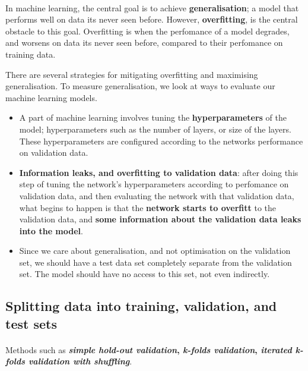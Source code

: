 \documentclass[12pt, a4paper]{article}
\begin{document}
\paragraph*{}
In machine learning, the central goal is to achieve \textbf{generalisation};
a model that performs well on data its never seen before. However, \textbf{overfitting},
is the central obstacle to this goal. Overfitting is when the perfomance of a model
degrades, and worsens on data its never seen before, compared to their perfomance
on training data.

There are several strategies for mitigating overfitting and maximising generalisation.
To measure generalisation, we look at ways to evaluate our machine learning models.

\begin{itemize}
   \item A part of machine learning involves tuning the \textbf{hyperparameters}
   of the model; hyperparameters such as the number of layers, or size of the layers.
   These hyperparameters are configured according to the networks performance on 
   validation data.
   \item \textbf{Information leaks, and overfitting to validation data}:
   after doing this step of tuning the network's hyperparameters according to perfomance
   on validation data, and then evaluating the network with that validation data,
   what begins to happen is that the \textbf{network starts to overfitt} to the validation data,
   and \textbf{some information about the validation data leaks into the model}.
   \item Since we care about generalisation, and not optimisation on the validation set,
   we should have a test data set completely separate from the validation set. The
   model should have no access to this set, not even indirectly.
\end{itemize}

\subsection{Splitting data into training, validation, and test sets}
\paragraph*{}
Methods such as \textbf{\textit{simple hold-out validation}, \textit{k-folds validation}, \textit{iterated
k-folds validation with shuffling}}.
\end{document}

